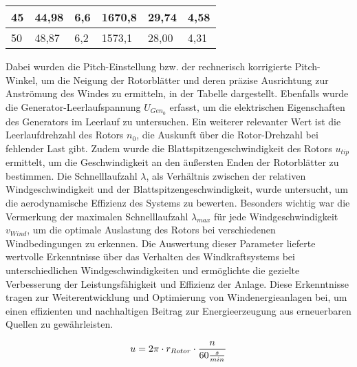 \begin{table}[ht!]
\begin{tabular}{|l|l|l|l|l|l|}
    \rowcolor[HTML]{C6E0B4} 
    45                                    & 44,98                                  & 6,6                                                & 1670,8                                   & 29,74                                         & 4,58                                    \\ \hline
    \rowcolor[HTML]{E2EFDA} 
    50                                    & 48,87                                  & 6,2                                                & 1573,1                                   & 28,00                                         & 4,31                                    \\ \hline
    \end{tabular}
    \end{table}

     Dabei wurden die Pitch-Einstellung bzw. der rechnerisch korrigierte Pitch-Winkel, um die Neigung der Rotorblätter und deren 
     präzise Ausrichtung zur Anströmung des Windes zu ermitteln, in der Tabelle dargestellt. Ebenfalls wurde die Generator-Leerlaufspannung $U_{Gen_0}$ erfasst, 
     um die elektrischen Eigenschaften des Generators im Leerlauf zu untersuchen. Ein weiterer relevanter Wert ist die Leerlaufdrehzahl des Rotors $n_0$, 
     die Auskunft über die Rotor-Drehzahl bei fehlender Last gibt. Zudem wurde die Blattspitzengeschwindigkeit des Rotors $u_{tip}$ ermittelt, um die Geschwindigkeit an den äußersten Enden der Rotorblätter zu bestimmen. 
     Die Schnelllaufzahl $\lambda$, als Verhältnis zwischen der relativen Windgeschwindigkeit und der Blattspitzengeschwindigkeit, wurde untersucht, um die aerodynamische Effizienz des Systems zu bewerten. Besonders wichtig war die Vermerkung der maximalen
    Schnelllaufzahl $\lambda_{max}$ für jede Windgeschwindigkeit $v_{Wind}$, um die optimale Auslastung des Rotors bei verschiedenen Windbedingungen zu erkennen. Die Auswertung dieser Parameter lieferte
    wertvolle Erkenntnisse über das Verhalten des Windkraftsystems bei unterschiedlichen Windgeschwindigkeiten und ermöglichte die gezielte Verbesserung der Leistungsfähigkeit und Effizienz der Anlage. Diese Erkenntnisse tragen zur Weiterentwicklung und 
    Optimierung von Windenergieanlagen bei,
     um einen effizienten und nachhaltigen 
     Beitrag zur Energieerzeugung aus erneuerbaren Quellen zu gewährleisten.

\begin{equation}
    \centering
    u = 2 \pi \cdot r_{Rotor} \cdot \frac{n}{60 \frac{s}{min}}
    \label{eq:230615_Umfangsgeschwindigkeit}
\end{equation}

